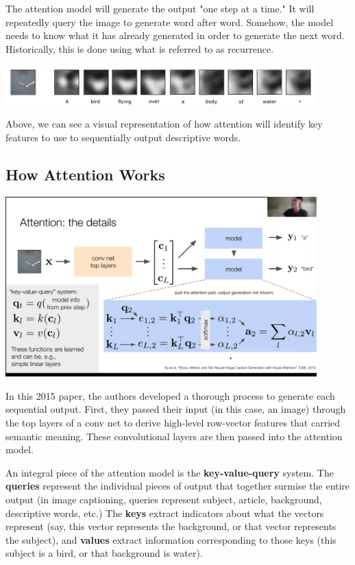 \documentclass[10pt,a4paper]{book}
\begin{document}
The attention model will generate the output "one step at a time." It will repeatedly query the image to generate word after word. Somehow, the model needs to know what it has already generated in order to generate the next word. Historically, this is done using what is referred to as recurrence. 

\includegraphics[width=0.9\textwidth]{images/PieceByPieceAttention.png} 

Above, we can see a visual representation of how attention will identify key features to use to sequentially output descriptive words.

\subsection{How Attention Works}
\includegraphics[width=0.9\textwidth]{images/AttentionModel.png}

In this 2015 paper, the authors developed a thorough process to generate each sequential output. First, they passed their input (in this case, an image) through the top layers of a conv net to derive high-level row-vector features that carried semantic meaning. These convolutional layers are then passed into the attention model. 

An integral piece of the attention model is the \textbf{key-value-query} system. The \textbf{queries} represent the individual pieces of output that together surmise the entire output (in image captioning, queries represent subject, article, background, descriptive words, etc.) The \textbf{keys} extract indicators about what the vectors represent (say, this vector represents the background, or that vector represents the subject), and \textbf{values} extract information corresponding to those keys (this subject is a bird, or that background is water).
\end{document}
